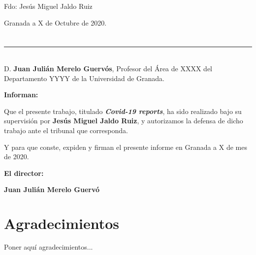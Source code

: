 \vspace{6cm}

\noindent Fdo: Jesús Miguel Jaldo Ruiz

\vspace{2cm}

\begin{flushright}
Granada a X de Octubre de 2020.
\end{flushright}


\chapter*{}
\thispagestyle{empty}

\noindent\rule[-1ex]{\textwidth}{2pt}\\[4.5ex]

D. \textbf{Juan Julián Merelo Guervós}, Profesor del Área de XXXX del Departamento YYYY de la Universidad de Granada.

\vspace{0.5cm}

\textbf{Informan:}

\vspace{0.5cm}

Que el presente trabajo, titulado \textit{\textbf{Covid-19 reports}},
ha sido realizado bajo su supervisión por \textbf{Jesús Miguel Jaldo Ruiz}, y autorizamos la defensa de dicho trabajo ante el tribunal
que corresponda.

\vspace{0.5cm}

Y para que conste, expiden y firman el presente informe en Granada a X de mes de 2020.

\vspace{1cm}

\textbf{El director:}

\vspace{5cm}

\noindent \textbf{Juan Julián Merelo Guervó}

\chapter*{Agradecimientos}
\thispagestyle{empty}

       \vspace{1cm}


Poner aquí agradecimientos...

